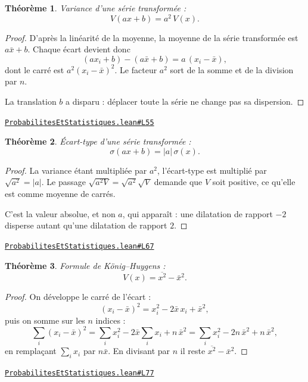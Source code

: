 \documentclass[11pt,a4paper]{article}
\theoremstyle{definition}
\theoremstyle{plain}
\newtheorem{theoreme}{Théorème}
\newcommand{\source}[2]{\par\smallskip\noindent\hfill{\footnotesize\href{#1}{\texttt{#2}}}\par\smallskip}
\begin{document}
\begin{theoreme}
Variance d'une série transformée :
\[ V(ax + b) = a^{2}\,V(x) . \]
\end{theoreme}

\begin{proof}
D'après la linéarité de la moyenne, la moyenne de la série transformée est
$a\bar x + b$. Chaque écart devient donc
\[ (a x_i + b) - (a\bar x + b) = a\,(x_i - \bar x) , \]
dont le carré est $a^{2}(x_i - \bar x)^{2}$. Le facteur $a^{2}$ sort de la somme et de la
division par $n$.

\medskip\noindent
La translation $b$ a disparu : déplacer toute la série ne change pas sa dispersion.
\end{proof}
\source{https://github.com/Commutator-IO/learn-lean/blob/main/courses/02-lycee/09-probabilites-et-statistiques/ProbabilitesEtStatistiques.lean\#L55}{ProbabilitesEtStatistiques.lean\#L55}

\begin{theoreme}
Écart-type d'une série transformée :
\[ \sigma(ax + b) = |a|\,\sigma(x) . \]
\end{theoreme}

\begin{proof}
La variance étant multipliée par $a^{2}$, l'écart-type est multiplié par
$\sqrt{a^{2}} = |a|$. Le passage $\sqrt{a^{2}V} = \sqrt{a^{2}}\sqrt{V}$ demande que $V$
soit positive, ce qu'elle est comme moyenne de carrés.

\medskip\noindent
C'est la valeur absolue, et non $a$, qui apparaît : une dilatation de rapport $-2$
disperse autant qu'une dilatation de rapport $2$.
\end{proof}
\source{https://github.com/Commutator-IO/learn-lean/blob/main/courses/02-lycee/09-probabilites-et-statistiques/ProbabilitesEtStatistiques.lean\#L67}{ProbabilitesEtStatistiques.lean\#L67}

\begin{theoreme}
Formule de König--Huygens :
\[ V(x) = \overline{x^{2}} - \bar x^{2} . \]
\end{theoreme}

\begin{proof}
On développe le carré de l'écart :
\[ (x_i - \bar x)^{2} = x_i^{2} - 2\bar x\,x_i + \bar x^{2} , \]
puis on somme sur les $n$ indices :
\[ \sum_i (x_i - \bar x)^{2}
   = \sum_i x_i^{2} - 2\bar x \sum_i x_i + n\,\bar x^{2}
   = \sum_i x_i^{2} - 2n\,\bar x^{2} + n\,\bar x^{2} , \]
en remplaçant $\sum_i x_i$ par $n\bar x$. En divisant par $n$ il reste
$\overline{x^{2}} - \bar x^{2}$.
\end{proof}
\source{https://github.com/Commutator-IO/learn-lean/blob/main/courses/02-lycee/09-probabilites-et-statistiques/ProbabilitesEtStatistiques.lean\#L77}{ProbabilitesEtStatistiques.lean\#L77}
\end{document}
